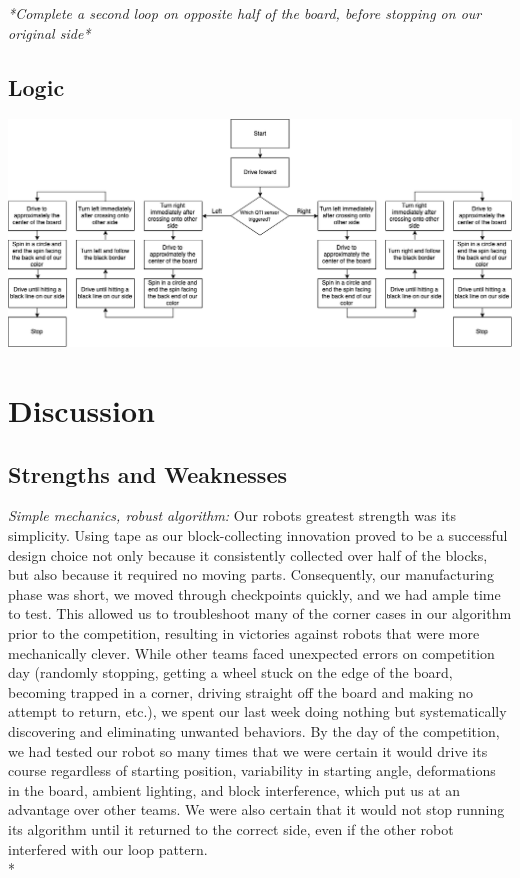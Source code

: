 \documentclass[11.5pt]{article}
\begin{document}
\noindent
\textit{*Complete a second loop on opposite half of the board, before stopping on our original side*}


\subsection{Logic}

\begin{center}
\includegraphics[scale=.41]{Images/flowchart.png}
\end{center}

\section{Discussion}
\subsection{Strengths and Weaknesses}
\textit{Simple mechanics, robust algorithm:}   Our robots greatest strength was its simplicity. Using tape as our block-collecting innovation proved to be a successful design choice not only because it consistently collected over half of the blocks, but also because it required no moving parts. Consequently, our manufacturing phase was short, we moved through checkpoints quickly, and we had ample time to test. This allowed us to troubleshoot many of the corner cases in our algorithm prior to the competition, resulting in victories against robots that were more mechanically clever. While other teams faced unexpected errors on competition day (randomly stopping, getting a wheel stuck on the edge of the board, becoming trapped in a corner, driving straight off the board and making no attempt to return, etc.), we spent our last week doing nothing but systematically discovering and eliminating unwanted behaviors. By the day of the competition, we had tested our robot so many times that we were certain it would drive its course regardless of starting position, variability in starting angle, deformations in the board, ambient lighting, and block interference, which put us at an advantage over other teams. We were also certain that it would not stop running its algorithm until it returned to the correct side, even if the other robot interfered with our loop pattern.
\\*
\end{document}
